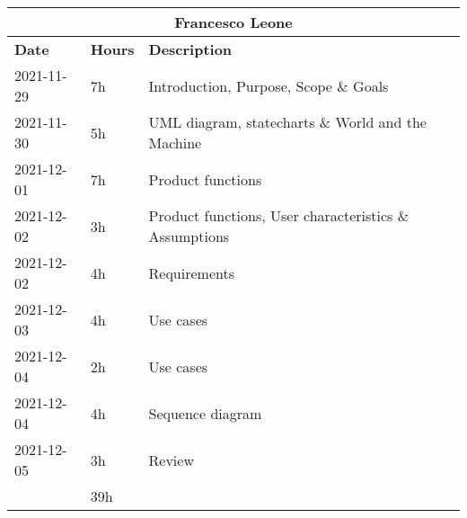 \begin{table}[H]
    \centering
    \begin{tabular}{|l|l|l|}
        \multicolumn{3}{c}{\textbf{Francesco Leone}}                      \\
        \hline
        \textbf{Date} & \textbf{Hours} & \textbf{Description}              \\\hline
        2021-11-29    & 7h             & Introduction, Purpose, Scope \& Goals                  \\\hline
        2021-11-30    & 5h             & UML diagram, statecharts \& World and the Machine      \\\hline
        2021-12-01    & 7h             & Product functions                                      \\\hline
        2021-12-02    & 3h             & Product functions, User characteristics \& Assumptions \\\hline
        2021-12-02    & 4h             & Requirements                                           \\\hline
        2021-12-03    & 4h             & Use cases                                              \\\hline
        2021-12-04    & 2h             & Use cases                                              \\\hline
        2021-12-04    & 4h             & Sequence diagram                                       \\\hline
        2021-12-05    & 3h             & Review                                                 \\\hline\hline
                      & 39h            &                                                        \\\hline
    \end{tabular}
\end{table}